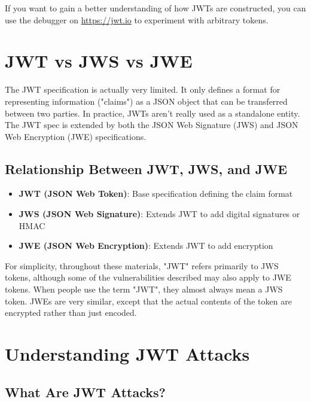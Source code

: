 \documentclass{article}
\begin{document}
\begin{notebox}
If you want to gain a better understanding of how JWTs are constructed, you can use the 
debugger on \url{https://jwt.io} to experiment with arbitrary tokens.
\end{notebox}

\section{JWT vs JWS vs JWE}

The JWT specification is actually very limited. It only defines a format for representing 
information ("claims") as a JSON object that can be transferred between two parties. In 
practice, JWTs aren't really used as a standalone entity. The JWT spec is extended by 
both the JSON Web Signature (JWS) and JSON Web Encryption (JWE) specifications.

\subsection{Relationship Between JWT, JWS, and JWE}

\begin{itemize}
    \item \textbf{JWT (JSON Web Token)}: Base specification defining the claim format
    \item \textbf{JWS (JSON Web Signature)}: Extends JWT to add digital signatures or HMAC
    \item \textbf{JWE (JSON Web Encryption)}: Extends JWT to add encryption
\end{itemize}

\begin{notebox}[Note]
For simplicity, throughout these materials, "JWT" refers primarily to JWS tokens, 
although some of the vulnerabilities described may also apply to JWE tokens. When 
people use the term "JWT", they almost always mean a JWS token. JWEs are very similar, 
except that the actual contents of the token are encrypted rather than just encoded.
\end{notebox}

\section{Understanding JWT Attacks}

\subsection{What Are JWT Attacks?}
\end{document}
